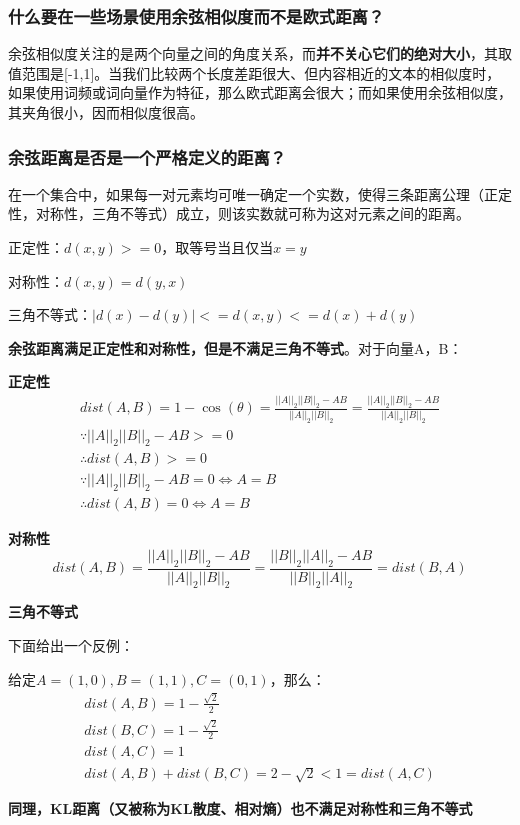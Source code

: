 \documentclass[12pt]{article}
\begin{document}
\subsubsection{什么要在一些场景使用余弦相似度而不是欧式距离？}
余弦相似度关注的是两个向量之间的角度关系，而\textbf{并不关心它们的绝对大小}，其取值范围是[-1,1]。当我们比较两个长度差距很大、但内容相近的文本的相似度时，如果使用词频或词向量作为特征，那么欧式距离会很大；而如果使用余弦相似度，其夹角很小，因而相似度很高。

\subsubsection{余弦距离是否是一个严格定义的距离？}
在一个集合中，如果每一对元素均可唯一确定一个实数，使得三条距离公理（正定性，对称性，三角不等式）成立，则该实数就可称为这对元素之间的距离。

正定性：$d(x,y)>=0$，取等号当且仅当$x=y$

对称性：$d(x,y)=d(y,x)$

三角不等式：$|d(x) - d(y)| <= d(x,y) <= d(x) + d(y)$


\textbf{余弦距离满足正定性和对称性，但是不满足三角不等式}。对于向量A，B：

\textbf{正定性}
\begin{gather*}
    dist(A,B) = 1 - \cos(\theta) = \frac{||A||_2||B||_2 - AB}{||A||_2||B||_2} = \frac{||A||_2||B||_2 - AB}{||A||_2||B||_2} \\
    \because ||A||_2||B||_2 - AB >= 0 \\
    \therefore dist(A,B) >= 0 \\
    \because ||A||_2||B||_2 - AB = 0  \Leftrightarrow A = B \\
    \therefore dist(A,B) = 0 \Leftrightarrow A = B
\end{gather*}

\textbf{对称性}
$$
dist(A,B) = \frac{||A||_2||B||_2 - AB}{||A||_2||B||_2} = \frac{||B||_2||A||_2 - AB}{||B||_2||A||_2} = dist(B,A)
$$

\textbf{三角不等式}

下面给出一个反例：

给定$A=(1,0), B=(1,1), C=(0,1)$，那么：
\begin{gather*}
dist(A,B) = 1 - \frac{\sqrt{2}}{2}   \\
dist(B,C) = 1 - \frac{\sqrt{2}}{2} \\
dist(A,C) = 1 \\
dist(A,B) + dist(B,C) = 2 - \sqrt{2} < 1 = dist(A,C)
\end{gather*}

\textbf{同理，KL距离（又被称为KL散度、相对熵）也不满足对称性和三角不等式}



\end{document}
